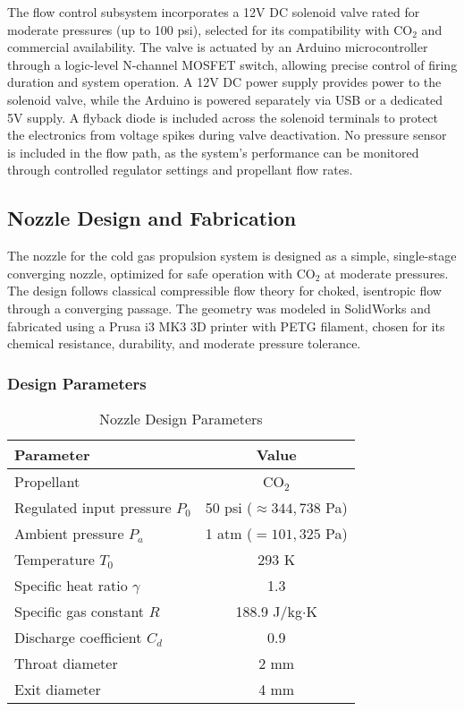 \documentclass{new-aiaa}
\begin{document}
The flow control subsystem incorporates a 12V DC solenoid valve rated for moderate pressures (up to 100 psi), selected for its compatibility with CO$_2$ and commercial availability. The valve is actuated by an Arduino microcontroller through a logic-level N-channel MOSFET switch, allowing precise control of firing duration and system operation. A 12V DC power supply provides power to the solenoid valve, while the Arduino is powered separately via USB or a dedicated 5V supply. A flyback diode is included across the solenoid terminals to protect the electronics from voltage spikes during valve deactivation. No pressure sensor is included in the flow path, as the system’s performance can be monitored through controlled regulator settings and propellant flow rates.


\subsection{Nozzle Design and Fabrication}

The nozzle for the cold gas propulsion system is designed as a simple, single-stage converging nozzle, optimized for safe operation with CO$_2$ at moderate pressures. The design follows classical compressible flow theory for choked, isentropic flow through a converging passage. The geometry was modeled in SolidWorks and fabricated using a Prusa i3 MK3 3D printer with PETG filament, chosen for its chemical resistance, durability, and moderate pressure tolerance.

\subsubsection{Design Parameters}

\begin{table}[h!]
    \centering
    \caption{Nozzle Design Parameters}
    \begin{tabular}{|l|c|}
        \hline
        \textbf{Parameter} & \textbf{Value} \\
        \hline
        Propellant & CO$_2$ \\
        Regulated input pressure $P_0$ & 50 psi ($\approx 344,738$ Pa) \\
        Ambient pressure $P_a$ & 1 atm ($= 101,325$ Pa) \\
        Temperature $T_0$ & 293 K \\
        Specific heat ratio $\gamma$ & 1.3 \\
        Specific gas constant $R$ & 188.9 J/kg$\cdot$K \\
        Discharge coefficient $C_d$ & 0.9 \\
        Throat diameter & 2 mm \\
        Exit diameter & 4 mm \\
        \hline
    \end{tabular}
\end{table}
\end{document}
